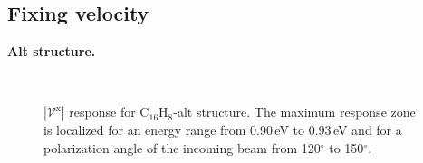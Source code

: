 \documentclass[prb,11pt,tightenlines,twocolumn,aps]{revtex4-1}
\begin{document}

\subsection{Fixing velocity} %
\label{sec:res-fixvel}

\textbf{Alt structure.}

\begin{figure}[tb]
    \centering
    \\
    \caption{$|\mathcal{V}^{\mathrm{x}}|$ response for C$_{16}$H$_{8}$-alt
    structure. The maximum response zone is localized for an energy range from
    0.90\,eV to 0.93\,eV and for a polarization angle of the
    incoming beam from 120$^{\circ}$ to 150$^{\circ}$.}
    \label{fig:alt-3d}
\end{figure}
\end{document}
